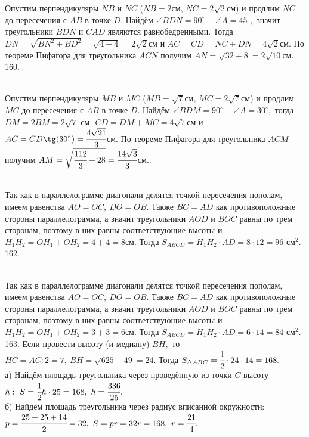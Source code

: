 Опустим перпендикуляры $NB$ и $NC$ ($NB=2$см, $NC=2\sqrt{2}$см) и продлим $NC$ до пересечения с $AB$ в точке $D.$ Найдём $\angle BDN=90^\circ-\angle A=45^\circ,$ значит треугольники $BDN$ и $CAD$ являются равнобедренными. Тогда $DN=\sqrt{BN^2+BD^2}=\sqrt{4+4}=2\sqrt{2}$см и $AC=CD=NC+DN=4\sqrt{2}$см. По теореме Пифагора для треугольника $ACN$ получим $AN=\sqrt{32+8}=2\sqrt{10}$см.\\
160. \begin{figure}[ht!]
\end{figure}\\
Опустим перпендикуляры $MB$ и $MC$ ($MB=\sqrt{7}$см, $MC=2\sqrt{7}$см) и продлим $MC$ до пересечения с $AB$ в точке $D.$ Найдём $\angle BDM=90^\circ-\angle A=30^\circ,$ тогда $DM=2BM=2\sqrt{7}\text{ см},\ CD=DM+MC=4\sqrt{7}$см и $AC=CD\tg(30^\circ)=\cfrac{4\sqrt{21}}{3}$см. По теореме Пифагора для треугольника $ACM$ получим $AM=\sqrt{\cfrac{112}{3}+28}=\cfrac{14\sqrt{3}}{3}$см.\newpage{}. \begin{figure}[ht!]
\end{figure}\\
Так как в параллелограмме диагонали делятся точкой пересечения пополам, имеем равенства $AO=OC,\ DO=OB.$ Также $BC=AD$ как противоположные стороны параллелограмма, а значит треугольники $AOD$ и $BOC$ равны по трём сторонам, поэтому в них равны соответствующие высоты и $H_1H_2=OH_1+OH_2=4+4=8$см. Тогда $S_{ABCD}=H_1H_2\cdot AD=8\cdot12=96\text{ см}^2.$\\
162. \begin{figure}[ht!]
\end{figure}\\
Так как в параллелограмме диагонали делятся точкой пересечения пополам, имеем равенства $AO=OC,\ DO=OB.$ Также $BC=AD$ как противоположные стороны параллелограмма, а значит треугольники $AOD$ и $BOC$ равны по трём сторонам, поэтому в них равны соответствующие высоты и $H_1H_2=OH_1+OH_2=3+3=6$см. Тогда $S_{ABCD}=H_1H_2\cdot AD=6\cdot14=84\text{ см}^2.$
163. Если провести высоту (и медиану) $BH,$ то $HC=AC:2=7,\ BH=\sqrt{625-49}=24.$ Тогда $S_{\Delta ABC}=\cfrac{1}{2}\cdot24\cdot14=168.$\\
а) Найдём площадь треугольника через проведённую из точки $C$ высоту $h:\ S=\cfrac{1}{2}h\cdot25=168,\ h=\cfrac{336}{25}.$\\
б) Найдём площадь треугольника через радиус вписанной окружности: $p=\cfrac{25+25+14}{2}=32,\ S=pr=32r=168,\ r=\cfrac{21}{4}.$\\
